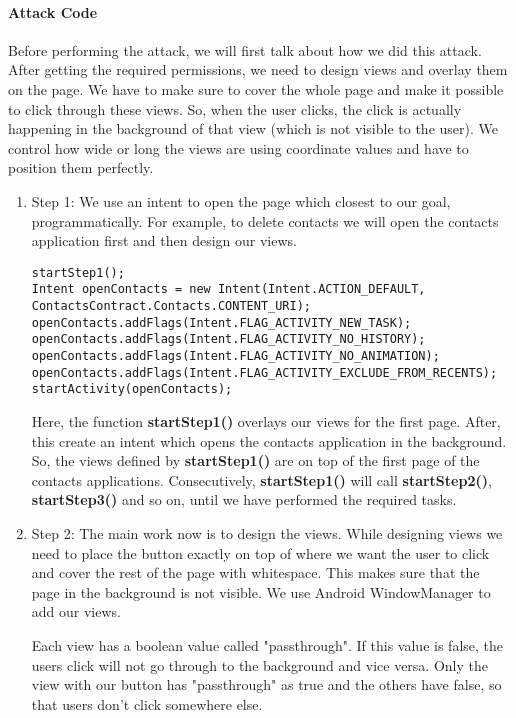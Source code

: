 \paragraph{Attack Code}
Before performing the attack, we will first talk about how we did this attack. \\
After getting the required permissions, we need to design views and overlay them on the page. We have to make sure to cover the whole page and make it possible to click through these views. So, when the user clicks, the click is actually happening in the background of that view (which is not visible to the user). We control how wide or long the views are using coordinate values and have to position them perfectly. 

\begin{enumerate}

\item Step 1: We use an intent to open the page which closest to our goal,
programmatically. For example, to delete contacts we will open the contacts
application first and then design our views.
    
\begin{lstlisting}
startStep1();
Intent openContacts = new Intent(Intent.ACTION_DEFAULT,  ContactsContract.Contacts.CONTENT_URI);
openContacts.addFlags(Intent.FLAG_ACTIVITY_NEW_TASK);
openContacts.addFlags(Intent.FLAG_ACTIVITY_NO_HISTORY);
openContacts.addFlags(Intent.FLAG_ACTIVITY_NO_ANIMATION);
openContacts.addFlags(Intent.FLAG_ACTIVITY_EXCLUDE_FROM_RECENTS);
startActivity(openContacts);
\end{lstlisting}

Here, the function \textbf{startStep1()} overlays our views for the first
page.  After, this create an intent which opens the contacts application in
the background. So, the views defined by \textbf{startStep1()} are on top
of the first page of the contacts applications. Consecutively,
\textbf{startStep1()} will call \textbf{startStep2()},
\textbf{startStep3()} and so on, until we have performed the required
tasks.

\item Step 2: The main work now is to design the views. While designing
views we need to place the button exactly on top of where we want the user
to click and cover the rest of the page with whitespace. This makes sure
that the page in the background is not visible. We use Android
WindowManager to add our views.

Each view has a boolean value called "passthrough". If this value is false,
the users click will not go through to the background and vice versa. Only
the view with our button has "passthrough" as true and the others have
false, so that users don't click
somewhere else.


\end{enumerate}
